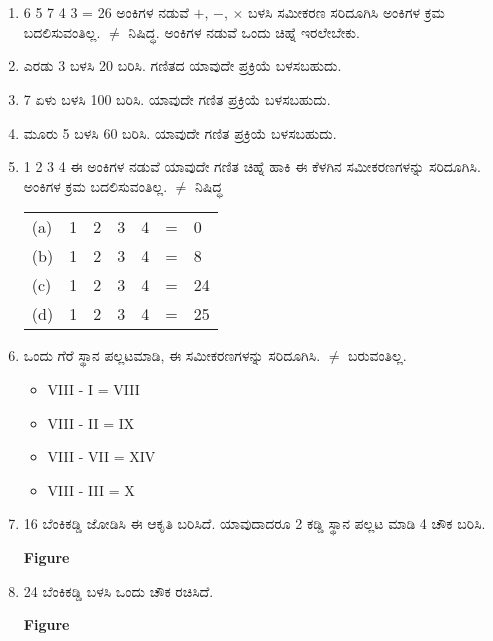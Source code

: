 \chapter{}\label{chap11}

\begin{enumerate}
\renewcommand{\labelenumi}{\bf\theenumi.}
\itemsep=5pt
\item 6 5 7 4 3 = 26 ಅಂಕಿಗಳ ನಡುವೆ $+$, $-$, $\times$ ಬಳಸಿ ಸಮೀಕರಣ ಸರಿದೂಗಿಸಿ ಅಂಕಿಗಳ ಕ್ರಮ ಬದಲಿಸುವಂತಿಲ್ಲ. $\neq$ ನಿಷಿದ್ಧ. ಅಂಕಿಗಳ ನಡುವೆ ಒಂದು ಚಿಹ್ನೆ ಇರಲೇಬೇಕು. 

\item ಎರಡು 3 ಬಳಸಿ 20 ಬರಿಸಿ. ಗಣಿತದ ಯಾವುದೇ ಪ್ರಕ್ರಿಯೆ ಬಳಸಬಹುದು. 

\item 7 ಏಳು ಬಳಸಿ 100 ಬರಿಸಿ. ಯಾವುದೇ ಗಣಿತ ಪ್ರಕ್ರಿಯೆ ಬಳಸಬಹುದು. 

\item ಮೂರು 5 ಬಳಸಿ 60 ಬರಿಸಿ. ಯಾವುದೇ ಗಣಿತ ಪ್ರಕ್ರಿಯೆ ಬಳಸಬಹುದು. 

\item 1 2 3 4 ಈ ಅಂಕಿಗಳ ನಡುವೆ ಯಾವುದೇ ಗಣಿತ ಚಿಹ್ನೆ ಹಾಕಿ ಈ ಕೆಳಗಿನ ಸಮೀಕರಣಗಳನ್ನು ಸರಿದೂಗಿಸಿ. ಅಂಕಿಗಳ ಕ್ರಮ ಬದಲಿಸುವಂತಿಲ್ಲ. $\neq$ ನಿಷಿದ್ಧ 
\begin{tabular}[t]{lllllll}
(a) & 1 & 2 & 3 & 4 & = & 0 \\
(b) & 1 & 2 & 3 & 4 & = & 8\\
(c) & 1 & 2 & 3 & 4 & = & 24\\
(d) & 1 & 2 & 3 & 4 & = & 25
\end{tabular}

\item ಒಂದು ಗೆರೆ ಸ್ಥಾನ ಪಲ್ಲಟಮಾಡಿ, ಈ ಸಮೀಕರಣಗಳನ್ನು ಸರಿದೂಗಿಸಿ. $\neq$ ಬರುವಂತಿಲ್ಲ. 
\begin{itemize}
\item[(a)] VIII - I = VIII
\item[(b)] VIII - II = IX
\item[(c)] VIII - VII = XIV
\item[(d)] VIII - III = X
\end{itemize}

\item 16 ಬೆಂಕಿಕಡ್ಡಿ ಜೋಡಿಸಿ ಈ ಆಕೃತಿ ಬರಿಸಿದೆ. ಯಾವುದಾದರೂ 2 ಕಡ್ಡಿ ಸ್ಥಾನ ಪಲ್ಲಟ ಮಾಡಿ 4 ಚೌಕ ಬರಿಸಿ. 
\begin{center}
{\bf Figure}
\end{center}

\item 24 ಬೆಂಕಿಕಡ್ಡಿ ಬಳಸಿ ಒಂದು ಚೌಕ ರಚಿಸಿದೆ. 
\begin{center}
{\bf Figure}
\end{center}


\end{enumerate}
